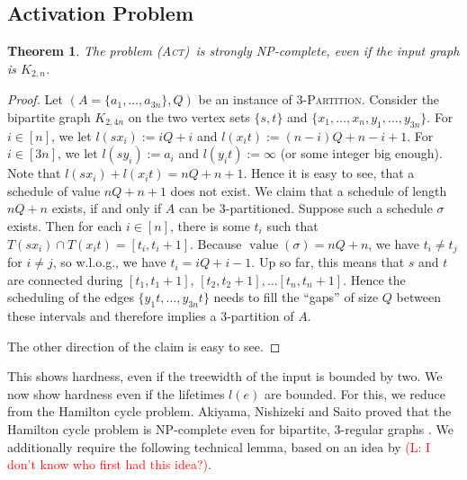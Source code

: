 \documentclass[10pt,a4paper]{article}
\newtheorem{theorem}{Theorem}[section]
\numberwithin{equation}{section}
\newcommand{\set}[1]{\{ #1 \}}
\newcommand{\fromto}[2]{\set{#1, \ldots, #2}}
\newcommand{\comment}[1]{\textcolor{red}{(L: #1)}}
\newcommand{\act}{\textsc{(Act)}}
\DeclareMathOperator{\val}{\text{value}}
\begin{document}
\subsection{Activation Problem}

\begin{theorem}
The problem \act\ is strongly NP-complete, even if the input graph is $K_{2,n}$.
\end{theorem}
\begin{proof}
Let $(A = \fromto{a_1}{a_{3n}}, Q)$ be an instance of \textsc{3-Partition}. Consider the  bipartite graph $K_{2,4n}$ on the two vertex sets $\set{s, t}$ and $\set{x_1, \ldots, x_n, y_1, \ldots, y_{3n}}$. For $i \in [n]$, we let $l(sx_i) := iQ + i$ and $l(x_it) := (n - i)Q + n - i + 1$. For $i \in [3n]$, we let $l(sy_i) := a_i$ and $l(y_it) := \infty$ (or some integer big enough). Note that $l(sx_i) + l(x_it) = nQ + n + 1$. Hence it is easy to see, that a schedule of value $nQ + n + 1$ does not exist. We claim that a schedule of length $nQ + n$ exists, if and only if $A$ can be 3-partitioned. Suppose such a schedule $\sigma$ exists. Then for each $i \in [n]$, there is some $t_i$ such that $T(sx_i) \cap T(x_it) = [t_i, t_i + 1]$. Because $\val(\sigma) = nQ + n$, we have $t_i \neq t_j$ for $i \neq j$, so w.l.o.g., we have $t_i = iQ + i - 1$. Up so far, this means that $s$ and $t$ are connected during $[t_1, t_1 +1]$, $[t_2, t_2 + 1], \ldots [t_n, t_n + 1]$. Hence the scheduling of the edges $\fromto{y_1t}{y_{3n}t}$ needs to fill the \enquote{gaps} of size $Q$ between these intervals and therefore implies a 3-partition of $A$.

The other direction of the claim is easy to see.
\end{proof}

This shows hardness, even if the treewidth of the input is bounded by two. We now show hardness even if the lifetimes $l(e)$ are bounded. For this, we reduce from the Hamilton cycle problem. Akiyama, Nishizeki and Saito proved that the Hamilton cycle problem is NP-complete even for bipartite, 3-regular graphs \cite{hamilton3regularBip}. We additionally require the following technical lemma, based on an idea by \comment{I don't know who first had this idea?}.
\end{document}

